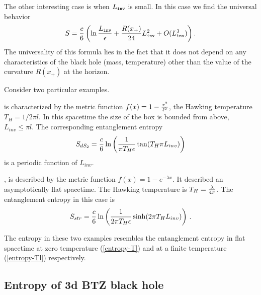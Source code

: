 \documentclass[12pt]{article}
\def\be{\begin{eqnarray}}
\def\ee{\end{eqnarray}}
\def\lb{\label}
\def\o{\over}
\begin{document}
The other interesting  case is
when  $L_{\tt inv}$ is small. In this case we find the universal
behavior \be S={c\over 6}\left(\ln{L_{\tt inv}\over
\epsilon}+{R(x_+)\over 24}L^2_{\tt
    inv}+O(L^3_{\tt inv})\right) .
\lb{Lsm} \ee The universality of this formula lies in the fact that
it does not depend on any characteristics of the  black hole (mass,
temperature) other than the value of the curvature $R(x_+)$ at the
horizon.

\bigskip

Consider two particular examples.

\medskip

 is characterized by the metric function $f(x)=1-{x^2\o l^2}$, the Hawking temperature $T_H=1/2\pi l$. In this spacetime the size of the box is bounded from above, $L_{inv}\leq \pi l$.  The corresponding entanglement entropy 
\be
S_{dS_2}={c\o 6}\ln \left({1\o \pi T_H\epsilon}\tan (T_H\pi L_{inv})\right)
\lb{de Sitter entropy}
\ee
is a periodic function of $L_{inv}$.

\medskip


 \cite{Witten:1991yr}, \cite{Mandal:1991tz} is described by the metric function $f(x)=1-e^{-\lambda x}$. It described an asymptotically flat spacetime. The Hawking temperature is 
$T_H={\lambda \o 4\pi}$. The entanglement entropy in this case is
\be
S_{str}={c\o 6}\ln \left({1\o 2\pi T_H\epsilon}\sinh (2\pi T_H L_{inv})\right)\, .
\lb{string inspired black hole}
\ee


The entropy in these two examples resembles the entanglement entropy in flat spacetime at zero temperature (\ref{entropy-T}) and at a finite temperature (\ref{entropy-Tl})  respectively.

\subsection{ Entropy of 3d BTZ black hole}
                              
                              
\end{document}
